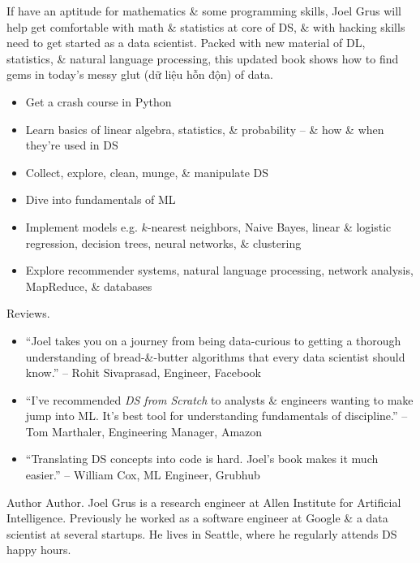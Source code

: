\documentclass{article}
\begin{document}
If have an aptitude for mathematics \& some programming skills, {\sc Joel Grus} will help get comfortable with math \& statistics at core of DS, \& with hacking skills need to get started as a data scientist. Packed with new material of DL, statistics, \& natural language processing, this updated book shows how to find gems in today's messy glut (dữ liệu hỗn độn) of data.
\begin{itemize}
	\item Get a crash course in Python
	\item Learn basics of linear algebra, statistics, \& probability -- \& how \& when they're used in DS
	\item Collect, explore, clean, munge, \& manipulate DS
	\item Dive into fundamentals of ML
	\item Implement models e.g. $k$-nearest neighbors, Naive Bayes, linear \& logistic regression, decision trees, neural networks, \& clustering
	\item Explore recommender systems, natural language processing, network analysis, MapReduce, \& databases
\end{itemize}
{\sf Reviews.}
\begin{itemize}
	\item ``{\sc Joel} takes you on a journey from being data-curious to getting a thorough understanding of bread-\&-butter algorithms that every data scientist should know.'' -- {\sc Rohit Sivaprasad}, Engineer, Facebook
	\item ``I've recommended {\it DS from Scratch} to analysts \& engineers wanting to make jump into ML. It's best tool for understanding fundamentals of discipline.'' -- {\sc Tom Marthaler}, Engineering Manager, Amazon
	\item ``Translating DS concepts into code is hard. {\sc Joel}'s book makes it much easier.'' -- {\sc William Cox}, ML Engineer, Grubhub
\end{itemize}
{\sf Author Author.} {\sc Joel Grus} is a research engineer at Allen Institute for Artificial Intelligence. Previously he worked as a software engineer at Google \& a data scientist at several startups. He lives in Seattle, where he regularly attends DS happy hours.
\end{document}

